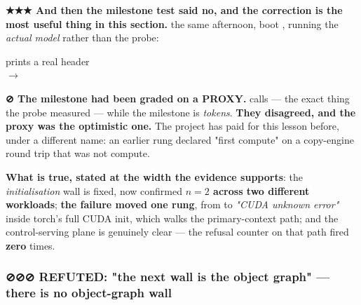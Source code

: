 \documentclass[10.5pt]{article}
\begin{document}
\begin{warnbox}\small
\textbf{★★★ And then the milestone test said no, and the correction is the most useful thing in
this section.} \measured{} the same afternoon, boot , running the \emph{actual
model} rather than the probe:

\begin{center}\small
{} \quad {} \quad
{} prints a real header \\[2pt]
 $\rightarrow$ \textbf{}
\\[2pt]
\textbf{ \quad {} \quad {} \quad
{}}
\end{center}

\smallskip
\textbf{⊘ The milestone had been graded on a PROXY.}  calls
 — the exact thing the probe measured — while the milestone is
\emph{tokens}. \textbf{They disagreed, and the proxy was the optimistic one.} The project has paid
for this lesson before, under a different name: an earlier rung declared "first compute" on a
copy-engine round trip that was not compute.

\smallskip
\textbf{What is true, stated at the width the evidence supports}: the 
\emph{initialisation} wall is fixed, now confirmed \textbf{$n = 2$ across two different
workloads}; \textbf{the failure moved one rung}, from
 to \emph{"CUDA unknown error"} inside torch's full CUDA
init, which walks the primary-context path; and the control-serving plane is genuinely clear —
the refusal counter on that path fired \textbf{zero} times.
\end{warnbox}

\subsubsection*{\texorpdfstring{⊘⊘⊘ REFUTED: "the next wall is the object graph" --- there is no object-graph wall}{REFUTED: there is no object-graph wall}}
\end{document}
